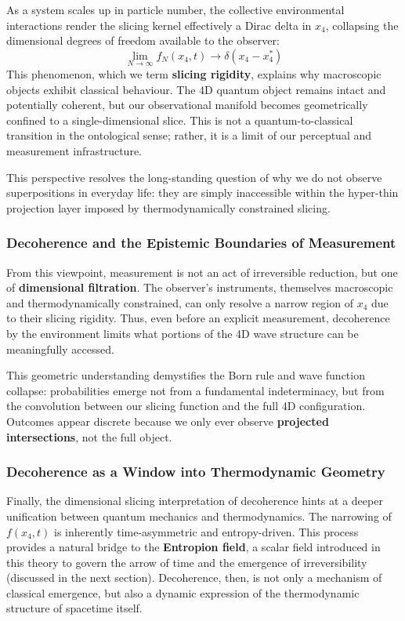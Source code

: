 \documentclass[12pt]{article}
\begin{document}
As a system scales up in particle number, the collective environmental interactions render the slicing kernel effectively a Dirac delta in $x_4$, collapsing the dimensional degrees of freedom available to the observer:
\begin{equation}
\lim_{N \rightarrow \infty} f_N(x_4, t) \rightarrow \delta(x_4 - x_4^{*})
\end{equation}
This phenomenon, which we term \textbf{slicing rigidity}, explains why macroscopic objects exhibit classical behaviour. The 4D quantum object remains intact and potentially coherent, but our observational manifold becomes geometrically confined to a single-dimensional slice. This is not a quantum-to-classical transition in the ontological sense; rather, it is a limit of our perceptual and measurement infrastructure.

This perspective resolves the long-standing question of why we do not observe superpositions in everyday life: they are simply inaccessible within the hyper-thin projection layer imposed by thermodynamically constrained slicing.

\subsubsection*{Decoherence and the Epistemic Boundaries of Measurement}

From this viewpoint, measurement is not an act of irreversible reduction, but one of \textbf{dimensional filtration}. The observer’s instruments, themselves macroscopic and thermodynamically constrained, can only resolve a narrow region of $x_4$ due to their slicing rigidity. Thus, even before an explicit measurement, decoherence by the environment limits what portions of the 4D wave structure can be meaningfully accessed.

This geometric understanding demystifies the Born rule and wave function collapse: probabilities emerge not from a fundamental indeterminacy, but from the convolution between our slicing function and the full 4D configuration. Outcomes appear discrete because we only ever observe \textbf{projected intersections}, not the full object.

\subsubsection*{Decoherence as a Window into Thermodynamic Geometry}

Finally, the dimensional slicing interpretation of decoherence hints at a deeper unification between quantum mechanics and thermodynamics. The narrowing of $f(x_4, t)$ is inherently time-asymmetric and entropy-driven. This process provides a natural bridge to the \textbf{Entropion field}, a scalar field introduced in this theory to govern the arrow of time and the emergence of irreversibility (discussed in the next section). Decoherence, then, is not only a mechanism of classical emergence, but also a dynamic expression of the thermodynamic structure of spacetime itself.
\end{document}
